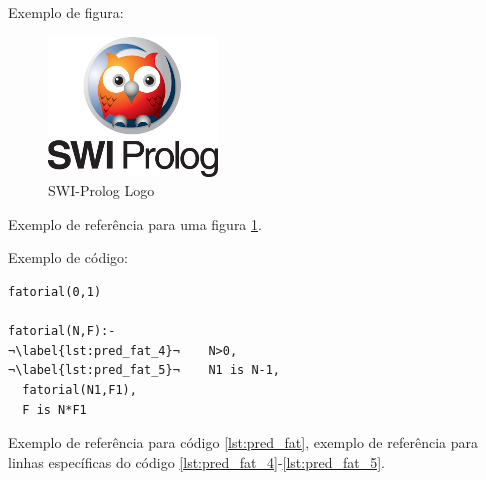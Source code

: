 Exemplo de figura:

\begin{figure}[ht]
\centering
\includegraphics[scale=0.5]{images/swipl.png}
\caption{SWI-Prolog Logo}
\label{fig:swipl}
\end{figure}

Exemplo de referência para uma figura \ref{fig:swipl}.

Exemplo de código:

\begin{lstlisting}[style=customProlog, caption={Predicado Fatorial},label={lst:pred_fat}]
fatorial(0,1)

fatorial(N,F):-
¬\label{lst:pred_fat_4}¬    N>0,
¬\label{lst:pred_fat_5}¬    N1 is N-1,
  fatorial(N1,F1),
  F is N*F1  
\end{lstlisting}

Exemplo de referência para código \ref{lst:pred_fat}, exemplo de referência para
linhas específicas do código \ref{lst:pred_fat_4}-\ref{lst:pred_fat_5}.

